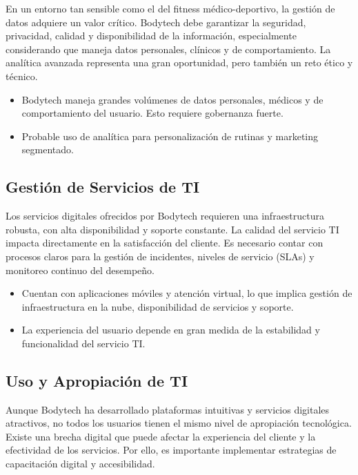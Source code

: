 En un entorno tan sensible como el del fitness médico-deportivo, la gestión de datos adquiere un valor crítico. Bodytech debe garantizar la seguridad, privacidad, calidad y disponibilidad de la información, especialmente considerando que maneja datos personales, clínicos y de comportamiento. La analítica avanzada representa una gran oportunidad, pero también un reto ético y técnico.

\begin{itemize}
  \item Bodytech maneja grandes volúmenes de datos personales, médicos y de comportamiento del usuario. Esto requiere gobernanza fuerte.
  \item Probable uso de analítica para personalización de rutinas y marketing segmentado.
\end{itemize}

\subsection{Gestión de Servicios de TI}

Los servicios digitales ofrecidos por Bodytech requieren una infraestructura robusta, con alta disponibilidad y soporte constante. La calidad del servicio TI impacta directamente en la satisfacción del cliente. Es necesario contar con procesos claros para la gestión de incidentes, niveles de servicio (SLAs) y monitoreo continuo del desempeño.

\begin{itemize}
  \item Cuentan con aplicaciones móviles y atención virtual, lo que implica gestión de infraestructura en la nube, disponibilidad de servicios y soporte.
  \item La experiencia del usuario depende en gran medida de la estabilidad y funcionalidad del servicio TI.
\end{itemize}

\subsection{Uso y Apropiación de TI}

Aunque Bodytech ha desarrollado plataformas intuitivas y servicios digitales atractivos, no todos los usuarios tienen el mismo nivel de apropiación tecnológica. Existe una brecha digital que puede afectar la experiencia del cliente y la efectividad de los servicios. Por ello, es importante implementar estrategias de capacitación digital y accesibilidad.

